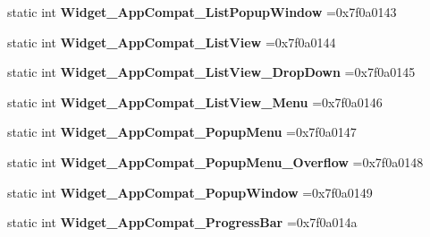 \begin{DoxyCompactItemize}
static int {\bfseries Widget\+\_\+\+App\+Compat\+\_\+\+List\+Popup\+Window} =0x7f0a0143
\item 
\mbox{\label{classandroid_1_1support_1_1v7_1_1appcompat_1_1R_1_1style_a0b130eaebc863386f919656a7c1914d3}} 
static int {\bfseries Widget\+\_\+\+App\+Compat\+\_\+\+List\+View} =0x7f0a0144
\item 
\mbox{\label{classandroid_1_1support_1_1v7_1_1appcompat_1_1R_1_1style_a4121ae87c13a63f968a237f0e754d2c3}} 
static int {\bfseries Widget\+\_\+\+App\+Compat\+\_\+\+List\+View\+\_\+\+Drop\+Down} =0x7f0a0145
\item 
\mbox{\label{classandroid_1_1support_1_1v7_1_1appcompat_1_1R_1_1style_a5db58048c883f36c0188b7248c5a4436}} 
static int {\bfseries Widget\+\_\+\+App\+Compat\+\_\+\+List\+View\+\_\+\+Menu} =0x7f0a0146
\item 
\mbox{\label{classandroid_1_1support_1_1v7_1_1appcompat_1_1R_1_1style_a2c9885686c52db35527b6c41828a9434}} 
static int {\bfseries Widget\+\_\+\+App\+Compat\+\_\+\+Popup\+Menu} =0x7f0a0147
\item 
\mbox{\label{classandroid_1_1support_1_1v7_1_1appcompat_1_1R_1_1style_aef814f5cf299b582b8610e8ae4fd6bc1}} 
static int {\bfseries Widget\+\_\+\+App\+Compat\+\_\+\+Popup\+Menu\+\_\+\+Overflow} =0x7f0a0148
\item 
\mbox{\label{classandroid_1_1support_1_1v7_1_1appcompat_1_1R_1_1style_a55153e743abcf56cd0090b222bec475b}} 
static int {\bfseries Widget\+\_\+\+App\+Compat\+\_\+\+Popup\+Window} =0x7f0a0149
\item 
\mbox{\label{classandroid_1_1support_1_1v7_1_1appcompat_1_1R_1_1style_a05bcbfc3cbc30bd5c1e424b36ba09f90}} 
static int {\bfseries Widget\+\_\+\+App\+Compat\+\_\+\+Progress\+Bar} =0x7f0a014a
\item 
\mbox{\label{classandroid_1_1support_1_1v7_1_1appcompat_1_1R_1_1style_a0bf9fd9043a2e9153c8c1387047fbafe}} 

\end{DoxyCompactItemize}
